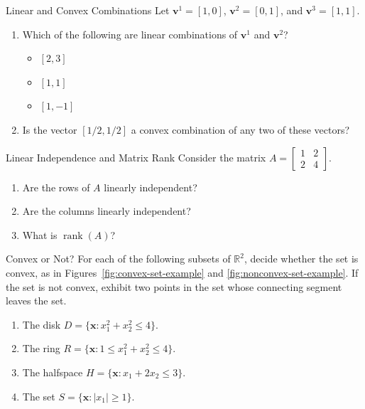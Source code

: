 \begin{ex}{Linear and Convex Combinations}{}
Let \( \mathbf{v}^1 = [1, 0] \), \( \mathbf{v}^2 = [0, 1] \), and \( \mathbf{v}^3 = [1, 1] \).

\begin{enumerate}
    \item Which of the following are linear combinations of \( \mathbf{v}^1 \) and \( \mathbf{v}^2 \)?  
    \begin{itemize}
        \item[(a)] \( [2, 3] \)  
        \item[(b)] \( [1, 1] \)  
        \item[(c)] \( [1, -1] \)
    \end{itemize}
    \item Is the vector \( [1/2, 1/2] \) a convex combination of any two of these vectors?
\end{enumerate}
\exrefs{\S\ref{sec:math-preliminaries}, \S\ref{sec:convexity}}
\end{ex}

\begin{ex}{Linear Independence and Matrix Rank}{}
Consider the matrix \( A = \begin{bmatrix} 1 & 2 \\ 2 & 4 \end{bmatrix} \).
\begin{enumerate}
    \item Are the rows of \( A \) linearly independent?
    \item Are the columns linearly independent?
    \item What is \( \operatorname{rank}(A) \)?
\end{enumerate}
\exrefs{\S\ref{sec:math-preliminaries}}
\end{ex}

\begin{ex}{Convex or Not?}{}
\label{ex:convex-or-not}
For each of the following subsets of \( \mathbb{R}^2 \), decide whether the set is convex, as in Figures~\ref{fig:convex-set-example} and \ref{fig:nonconvex-set-example}. If the set is not convex, exhibit two points in the set whose connecting segment leaves the set.
\begin{enumerate}
    \item The disk \( D = \{ \mathbf{x} : x_1^2 + x_2^2 \leq 4 \} \).
    \item The ring \( R = \{ \mathbf{x} : 1 \leq x_1^2 + x_2^2 \leq 4 \} \).
    \item The halfspace \( H = \{ \mathbf{x} : x_1 + 2x_2 \leq 3 \} \).
    \item The set \( S = \{ \mathbf{x} : |x_1| \geq 1 \} \).
\end{enumerate}
\exrefs{\S\ref{sec:convexity}}
\end{ex}

